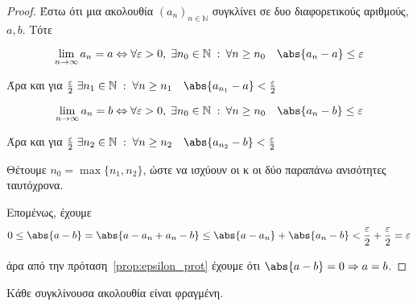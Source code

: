 \documentclass[main.tex]{subfiles}
\begin{document}
\begin{proof}
    Έστω ότι μια ακολουθία $ (a_{n})_{n \in \mathbb{N}} $ συγκλίνει σε 
    δυο διαφορετικούς αριθμούς, $ a,b $. Τότε

    \[ 
        \lim_{n \to \infty} a_{n} = a \Leftrightarrow \forall 
        \varepsilon > 0, \; \exists n_{0} \in \mathbb{N} \; : \: 
        \forall n \geq n_{0} \quad \abs{a_{n}- a} \leq \varepsilon 
    \]

    Άρα και για $ \frac{\varepsilon}{2} \; \exists n_{1} \in 
    \mathbb{N} \; : \; \forall n \geq n_{1} \quad \abs{a_{n_{1}} - a} 
    < \frac{\varepsilon}{2}  $

    \[ 
        \lim_{n \to \infty} a_{n} = b \Leftrightarrow \forall 
        \varepsilon > 0, \; \exists n_{0} \in \mathbb{N} \; : \: 
        \forall n \geq n_{0} \quad \abs{a_{n}- b} \leq \varepsilon 
    \]

    Άρα και για $ \frac{\varepsilon}{2} \; \exists n_{2} \in 
    \mathbb{N} \; : \; \forall n \geq n_{2}  \quad 
    \abs{a_{n_{2}} - b} < \frac{\varepsilon}{2}  $

    Θέτουμε $ n_{0} = \max \{ n_{1}, n_{2} \} $, ώστε να ισχύουν οι 
    κ οι δύο παραπάνω ανισότητες ταυτόχρονα. 

    Επομένως, έχουμε 
    \[
        0 \leq \abs{a-b} = \abs{a- a_{n}+ a_{n}- b} \leq 
        \abs{a- a_{n}} + \abs{a_{n}- b} < \frac{\varepsilon}{2} + 
        \frac{\varepsilon}{2} = \varepsilon 
    \] 

    άρα από την πρόταση~\ref{prop:epsilon_prot} έχουμε ότι 
    $ \abs{a-b} = 0 \Rightarrow a=b $.
\end{proof}


\begin{thm}
    Κάθε συγκλίνουσα ακολουθία είναι φραγμένη.
\end{thm}
\end{document}
